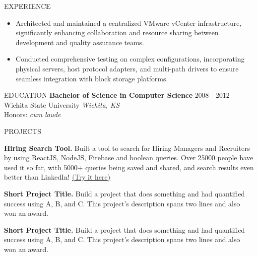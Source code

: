 \documentclass{faang} %
\begin{document}
\begin{rSection}{EXPERIENCE}
\begin{itemize}
    \item Architected and maintained a centralized VMware vCenter infrastructure, significantly enhancing collaboration and resource sharing between development and quality assurance teams.
    \item Conducted comprehensive testing on complex configurations, incorporating physical servers, host protocol adapters, and multi-path drivers to ensure seamless integration with block storage platforms.
  \end{itemize}
\end{rSection} 


\begin{rSection}{EDUCATION}
{\bf Bachelor of Science in Computer Science} \hfill {2008 - 2012}\\
Wichita State University \hfill {\it Wichita, KS}\\
Honors: {\it cum laude} \smallskip \\
\end{rSection}


\begin{rSection}{PROJECTS}
\vspace{-1.25em}
\item \textbf{Hiring Search Tool.} {Built a tool to search for Hiring Managers and Recruiters by using ReactJS, NodeJS, Firebase and boolean queries. Over 25000 people have used it so far, with 5000+ queries being saved and shared, and search results even better than LinkedIn! \href{https://hiring-search.careerflow.ai/}{(Try it here)}}
\item \textbf{Short Project Title.} {Build a project that does something and had quantified success using A, B, and C. This project's description spans two lines and also won an award.}
\item \textbf{Short Project Title.} {Build a project that does something and had quantified success using A, B, and C. This project's description spans two lines and also won an award.}
\end{rSection} 
\end{document}
